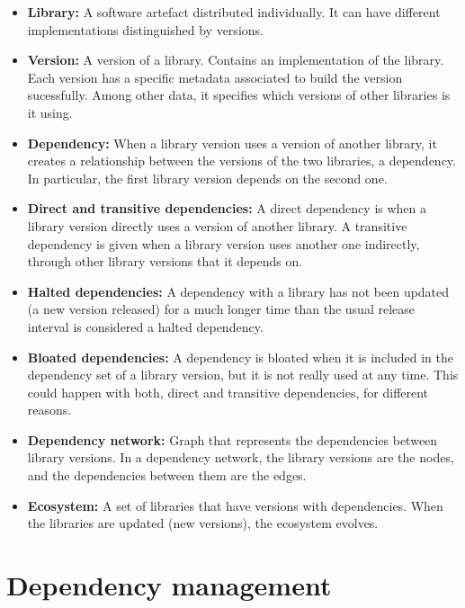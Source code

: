 \begin{itemize}
  \item \textbf{Library:} A software artefact distributed individually. It can have different implementations distinguished by versions.

  \item \textbf{Version:} A version of a library. Contains an implementation of the library. Each version has a specific metadata associated to build the version sucessfully. Among other data, it specifies which versions of other libraries is it using.

  \item \textbf{Dependency:} When a library version uses a version of another library, it creates a relationship between the versions of the two libraries, a dependency. In particular, the first library version depends on the second one.

  \item \textbf{Direct and transitive dependencies:} A direct dependency is when a library version directly uses a version of another library. A transitive dependency is given when a library version uses another one indirectly, through other library versions that it depends on.

  \item \textbf{Halted dependencies:} A dependency with a library has not been updated (a new version released) for a much longer time than the usual release interval is considered a halted dependency.

  \item \textbf{Bloated dependencies:} A dependency is bloated when it is included in the dependency set of a library version, but it is not really used at any time. This could happen with both, direct and transitive dependencies, for different reasons.

  \item \textbf{Dependency network:} Graph that represents the dependencies between library versions. In a dependency network, the library versions are the nodes, and the dependencies between them are the edges.

  \item \textbf{Ecosystem:} A set of libraries that have versions with dependencies. When the libraries are updated (new versions), the ecosystem evolves.
\end{itemize}

\section{Dependency management}

